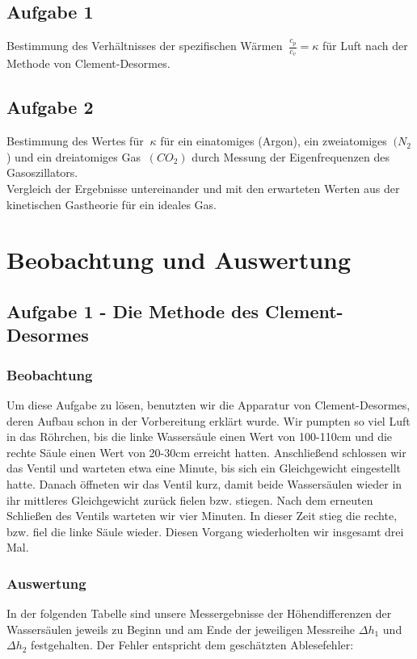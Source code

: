 \documentclass{article}
\begin{document}
{{{\subsection{Aufgabe 1}
Bestimmung des Verhältnisses der spezifischen Wärmen \(\ \frac{c_{p}}{c_{v}}=\kappa \) für Luft nach der Methode von {\sc Clement-Desormes}.
\subsection{Aufgabe 2}
Bestimmung des Wertes für \(\ \kappa \)  für ein einatomiges (Argon), ein zweiatomiges \(\ (N_{2}\)) und ein dreiatomiges Gas \(\ (CO_{2})\) durch Messung der Eigenfrequenzen des Gasoszillators.\\
Vergleich der Ergebnisse untereinander und mit den erwarteten Werten aus der kinetischen Gastheorie für ein ideales Gas.

\newpage

\section{Beobachtung und Auswertung}
\subsection{Aufgabe 1 - Die Methode des Clement-Desormes}
\subsubsection{Beobachtung}
Um diese Aufgabe zu lösen, benutzten wir die Apparatur von Clement-Desormes, deren Aufbau schon in der Vorbereitung erklärt wurde. Wir pumpten so viel Luft in das Röhrchen, bis die linke Wassersäule einen Wert von 100-110cm und die rechte Säule einen Wert von 20-30cm erreicht hatten. Anschließend schlossen wir das Ventil und warteten etwa eine Minute, bis sich ein Gleichgewicht eingestellt hatte. Danach öffneten wir das Ventil kurz, damit beide Wassersäulen wieder in ihr mittleres Gleichgewicht zurück fielen bzw. stiegen. Nach dem erneuten Schließen des Ventils warteten wir vier Minuten. In dieser Zeit stieg die rechte, bzw. fiel die linke Säule wieder. Diesen Vorgang wiederholten wir insgesamt drei Mal.\\

\subsubsection{Auswertung}
In der folgenden Tabelle sind unsere Messergebnisse der Höhendifferenzen der Wassersäulen jeweils zu Beginn und am Ende der jeweiligen Messreihe \(\Delta h_1\) und \(\Delta h_2\) festgehalten. Der Fehler entspricht dem geschätzten Ablesefehler:
\\

}}}
\end{document}
